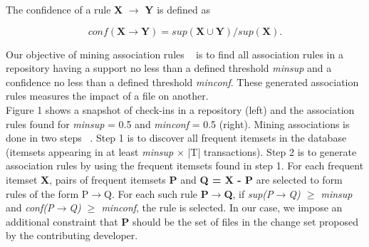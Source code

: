 The confidence of a rule \textbf{X} $\rightarrow$ \textbf{Y} is defined as 

\begin{equation}
conf(\textbf{X} \rightarrow \textbf{Y}) = \textit{sup}(\textbf{X}\cup\textbf{Y}) / \textit{sup}(\textbf{X}). 
\end{equation}

Our objective of mining association rules ~\cite{Agrawal} is to find all association rules in a repository having a support no less than a defined threshold \textit{minsup} and a confidence no less
than a defined threshold \textit{minconf}. These generated association rules measures the impact of a file on another. \\

Figure 1 shows a snapshot of check-ins in a repository (left) and the association rules found for \textit{minsup} = 0.5 and \textit{minconf} = 0.5 (right). Mining associations is done in two steps ~\cite{Agrawal}. Step 1 is to discover all frequent itemsets in the database (itemsets appearing in at least \textit{minsup} $\times$ |T| transactions). Step 2 is to generate association rules by using the frequent itemsets found in step 1. For each frequent itemset \textbf{X}, pairs of frequent itemsets \textbf{P} and \textbf{Q = X - P} are selected to form rules of the form P$\rightarrow$Q. For each such rule \textbf{P$\rightarrow$Q}, if \textit{sup(P$\rightarrow$Q) $\ge$ minsup} and \textit{conf(P$\rightarrow$Q) $\ge$ minconf}, the rule is selected. In our case, we impose an additional constraint that \textbf{P} should be the set of files in the change set proposed by the contributing developer.

